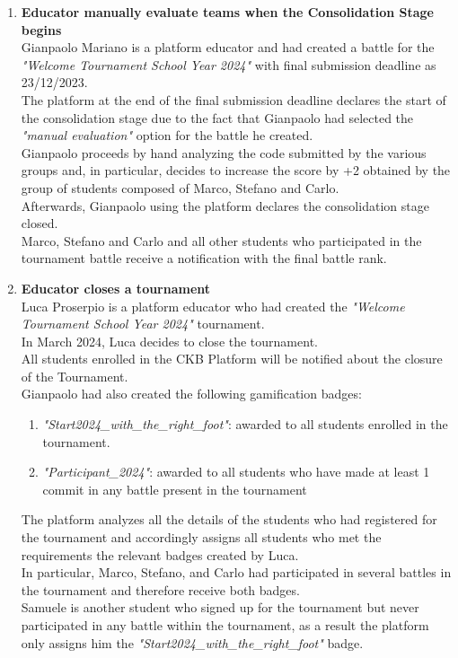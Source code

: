 \begin{enumerate}
	\item \textbf{Educator manually evaluate teams when the Consolidation Stage begins}\\
	      Gianpaolo Mariano is a platform educator and had created a battle for the \emph{"Welcome Tournament School Year 2024"} with final submission deadline as 23/12/2023.\\
	      The platform at the end of the final submission deadline declares the start of the consolidation stage due to the fact that Gianpaolo had selected the \emph{"manual evaluation"} option for the battle he created.\\
	      Gianpaolo proceeds by hand analyzing the code submitted by the various groups and, in particular, decides to increase the score by +2 obtained by the group of students composed of Marco, Stefano and Carlo.\\
	      Afterwards, Gianpaolo using the platform declares the consolidation stage closed.\\
	      Marco, Stefano and Carlo and all other students who participated in the tournament battle receive a notification with the final battle rank.


	\item \textbf{Educator closes a tournament}\\
	      Luca Proserpio is a platform educator who had created the \emph{"Welcome Tournament School Year 2024"} tournament.\\
	      In March 2024, Luca decides to close the tournament.\\
	      All students enrolled in the CKB Platform will be notified about the closure of the Tournament.\\
	      Gianpaolo had also created the following gamification badges:
	      \begin{enumerate}
		      \item \emph{"Start2024_with_the_right_foot"}: awarded to all students enrolled in the tournament.
		      \item \emph{"Participant_2024"}: awarded to all students who have made at least 1 commit in any battle present in the tournament
	      \end{enumerate}
	      The platform analyzes all the details of the students who had registered for the tournament and accordingly assigns all students who met the requirements the relevant badges created by Luca.\\
	      In particular, Marco, Stefano, and Carlo had participated in several battles in the tournament and therefore receive both badges.\\
	      Samuele is another student who signed up for the tournament but never participated in any battle within the tournament, as a result the platform only assigns him the \emph{"Start2024_with_the_right_foot"} badge.

\end{enumerate}


